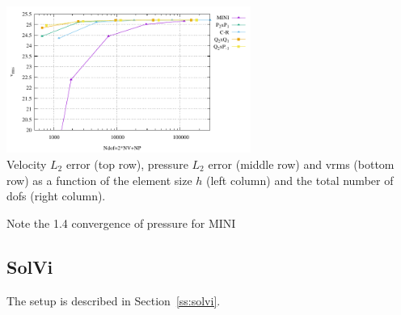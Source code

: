 \begin{center}
\includegraphics[width=8cm]{python_codes/fieldstone_112/results/exp4/vrms_ndof.pdf}\\
{\captionfont Velocity $L_2$ error (top row), pressure $L_2$ error (middle row) and vrms (bottom row) 
as a function of the element size $h$ (left column) and the total number of dofs (right column).}
\end{center}

Note the 1.4 convergence of pressure for MINI

\newpage
\subsection*{SolVi}

The setup is described in Section~\ref{ss:solvi}. 

